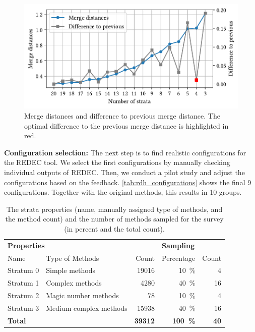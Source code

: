 \documentclass[%
class=scrreprt,
chapterprefix=false,%
open=right,%
twoside=true,%
paper=a4,%
logofile={Logo\_zentral\_farbig\_EN.png},%
thesistype=master,%
UKenglish,%
]{se2thesis}
\theoremstyle{definition}
\newcommand{\numOriginal}{39312\xspace}
\newcommand{\rdh}{REDEC\xspace}
\begin{document}
	\begin{figure}[tb]
		\centering
		\includegraphics[width=\textwidth]{img/strata_merge_distances.pdf}
		\caption{Merge distances and difference to previous merge distance. The optimal difference to the previous merge distance is highlighted in red.} 
		\label{fig:strata_merge_distances}
	\end{figure}
	
	\textbf{Configuration selection:} The next step is to find realistic configurations for the \rdh tool. We select the first configurations by manually checking individual outputs of \rdh. Then, we conduct a pilot study and adjust the configurations based on the feedback.
    \autoref{tab:rdh_configurations} shows the final 9 configurations. Together with the original methods, this results in 10 groups.
	
	\begin{table}[tb]
		\centering
		\caption{The strata properties (name, manually assigned type of methods, and the method count) and the number of methods sampled for the survey (in percent and the total count).}
		\label{tab:strata_info}
		\begin{tabular}{llr|rr}
			\toprule
			\multicolumn{3}{l|}{\textbf{Properties}} & \multicolumn{2}{l}{\textbf{Sampling}} \\
			Name & Type of Methods & Count & Percentage & Count \\
			\midrule
			Stratum 0 & Simple methods & 19016 & 10~\% & 4 \\
			Stratum 1 & Complex methods & 4280 & 40~\% & 16 \\
			Stratum 2 & Magic number methods & 78 & 10~\% & 4 \\
			Stratum 3 & Medium complex methods & 15938 & 40~\% & 16 \\
			\midrule
			\textbf{Total} & & \textbf{\numOriginal} & \textbf{100~\%} & \textbf{40} \\
			\bottomrule
		\end{tabular}
	\end{table}
	
\end{document}
